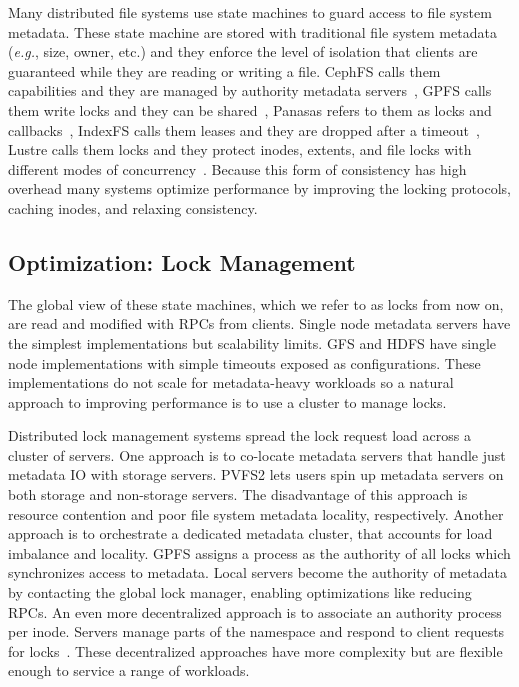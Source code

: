 Many distributed file systems use state machines to guard access to file system
metadata.  These state machine are stored with traditional file system metadata
({\it e.g.}, size, owner, etc.) and they enforce the level of isolation that
clients are guaranteed while they are reading or writing a file. CephFS calls
them capabilities and they are managed by authority metadata servers~\cite{},
GPFS calls them write locks and they can be shared~\cite{}, Panasas refers to
them as locks and callbacks~\cite{}, IndexFS calls them leases and they are
dropped after a timeout~\cite{}, Lustre calls them locks and they protect
inodes, extents, and file locks with different modes of
concurrency~\cite{wang:tech09-lustre}.  Because this form of consistency has
high overhead many systems optimize performance by improving the locking
protocols, caching inodes, and relaxing consistency.

\subsection{Optimization: Lock Management}

The global view of these state machines, which we refer to as locks from now
on, are read and modified with RPCs from clients.  Single node metadata
servers have the simplest implementations but scalability limits. GFS and HDFS
have single node implementations with simple timeouts exposed as
configurations. These implementations do not scale for metadata-heavy workloads
so a natural approach to improving performance is to use a cluster to manage
locks.

Distributed lock management systems spread the lock request load across a
cluster of servers. One approach is to co-locate metadata servers that
handle just metadata IO with storage servers. PVFS2 lets users spin up metadata
servers on both storage and non-storage servers. The disadvantage of this
approach is resource contention and poor file system metadata locality,
respectively. Another approach is to orchestrate a dedicated metadata cluster,
that accounts for load imbalance and locality. GPFS assigns a process as the
authority of all locks which synchronizes access to metadata. Local servers
become the authority of metadata by contacting the global lock manager,
enabling optimizations like reducing RPCs. An even more decentralized approach
is to associate an authority process per inode. Servers manage parts of the
namespace and respond to client requests for locks~\cite{wang:tech09-lustre,
ren:sc2014-indexfs, weil:sc2004-dyn-metadata, welch:fast08-panasas}.  These
decentralized approaches have more complexity but are flexible enough to
service a range of workloads.

